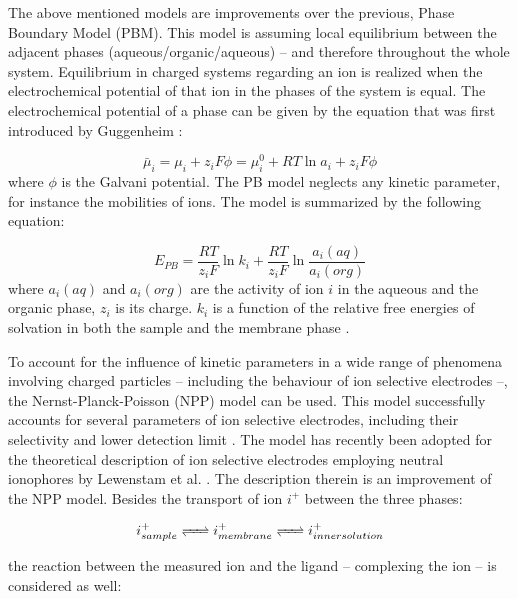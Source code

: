 The above mentioned models are improvements over the previous, Phase Boundary Model (PBM).
This model is assuming local equilibrium between the adjacent phases (aqueous/organic/aqueous) -- and therefore throughout the whole system.
Equilibrium in charged systems regarding an ion is realized when the electrochemical potential of that ion in the phases of the system is equal. The electrochemical potential of a phase can be given by the equation that was first introduced by Guggenheim \cite{guggenheim1929conceptions, guggenheim1930conception}:

\begin{equation}
\bar\mu_i = \mu_i + z_i F \phi = \mu_i^0 + RT\ln a_i + z_i F \phi
\end{equation}
where $\phi$ is the Galvani potential.
The PB model neglects any kinetic parameter, for instance the mobilities of ions.
The model is summarized by the following equation:

\begin{equation}
E_{PB} = \frac{RT}{z_i F}\ln k_i + \frac{RT}{z_i F}\ln \frac{a_i(aq)}{a_i(org)}
\end{equation}
where $a_i(aq)$ and $a_i(org)$ are the activity of ion $i$ in the aqueous and the organic phase, $z_i$ is its charge. $k_i$ is a function of the relative free energies of solvation in both the sample and the membrane phase \cite{bakker2004phase}.

To account for the influence of kinetic parameters in a wide range of phenomena involving charged particles -- including the behaviour of ion selective electrodes --, the Nernst-Planck-Poisson (NPP) model \cite{planck1890ueber, nernst1889elektromotorische, planck1890ueber2} can be used.
This model successfully accounts for several parameters of ion selective electrodes, including their selectivity \cite{lingenfelter2006time} and lower detection limit \cite{sokalski2009time}.
The model has recently been adopted for the theoretical description of ion selective electrodes employing neutral ionophores by Lewenstam et al. \cite{jasielec2015neutral}.
The description therein is an improvement of the NPP model.
Besides the transport of ion $i^+$ between the three phases:

\label{ligand}

\begin{equation}
  i^+_{sample} \ce{<=>} i^+_{membrane} \ce{<=>} i^+_{inner  solution}
\end{equation}

the reaction between the measured ion and the ligand -- complexing the ion -- is considered as well:

